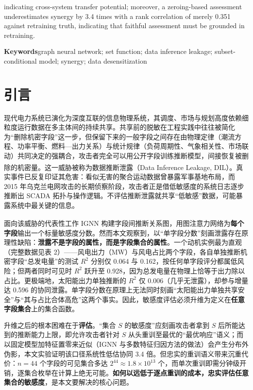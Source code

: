 \documentclass[10.5pt,compsoc,UTF8]{CjC}
\theoremstyle{mystyle}
\newcommand{\upcite}[1]{\textsuperscript{\cite{#1}}}
\begin{document}
{{indicating cross-system transfer potential; moreover, a zeroing-based assessment underestimates synergy by 3.4 times with a rank correlation of merely 0.351 against retraining truth, indicating that faithful assessment must be grounded in retraining.
\par}}
\vspace {5mm}

{{\bf Keywords}\quad graph neural network; set function; data inference leakage; subset-conditional model; synergy; data desensitization\par}

\vskip 10mm

\section{\heiti 引言}

现代电力系统已演化为深度互联的信息物理系统，其调度、市场与规划高度依赖细粒度运行数据在多主体间的持续共享。共享前的脱敏在工程实践中往往被简化为“删除机密字段”这一步，但保留下来的一般字段之间存在由物理定律（潮流方程、功率平衡、燃料—出力关系）与统计规律（负荷周期性、气象相关性、市场联动）共同决定的强耦合，攻击者完全可以用公开字段训练推断模型，间接恢复被删除的机密量。这一威胁被称为数据推断泄露（Data Inference Leakage, DIL）\upcite{hu2026ignn}。真实事件已反复印证其危害：看似无害的聚合运动数据曾暴露军事基地布局，而 2015 年乌克兰电网攻击的长期侦察阶段，攻击者正是借低敏感度的系统日志逐步推断出 SCADA 拓扑与操作逻辑。不评估推断泄露就共享“低敏感”数据，可能暴露系统中最关键的信息。

面向该威胁的代表性工作 IGNN\upcite{hu2026ignn} 构建字段间推断关系图，用图注意力网络为\textbf{每个字段}输出一个标量敏感度分数。然而本文观察到，以“单字段分数”刻画泄露存在原理性缺陷：\textbf{泄露不是字段的属性，而是字段集合的属性}。一个动机实例最为直观（完整数据见表 2）——风电出力（MW）与风电占比两个字段，各自单独推断机密字段“总发电量”的测试 $R^2$ 分别仅 0.064 与 0.162，按任何单字段评分都属低风险；但两者同时可见时 $R^2$ 跃升至 0.928，因为总发电量在物理上恰等于出力除以占比。更极端地，太阳能出力单独推断的 $R^2$ 仅 0.006（几乎无泄露），却参与增量达 0.596 的协同泄露。单字段分数在原理上无法同时刻画“太阳能出力单独共享安全”与“其与占比合体高危”这两个事实。因此，敏感度评估必须升维为定义在\textbf{任意字段集合}上的集合函数。

升维之后的根本困难在于\textbf{评估}。“集合 $S$ 的敏感度”应刻画攻击者拿到 $S$ 后所能达到的推断能力上限，即允许攻击者针对 $S$ 从头重训至最优的“最优响应”语义；而以固定模型加特征置零来近似（IGNN 与多数特征归因方法的做法）会产生分布外伪影，本文实验证明该口径系统性低估协同 3.4 倍。但忠实的重训语义带来沉重代价：$n=44$ 个字段的可见集合多达 $2^{44}\approx1.8\times10^{13}$ 个，而单次重训即需分钟级开销，逐集合枚举在计算上绝无可能。\textbf{如何以远低于逐点重训的成本，忠实评估任意集合的敏感度}，是本文要解决的核心问题。
\end{document}

